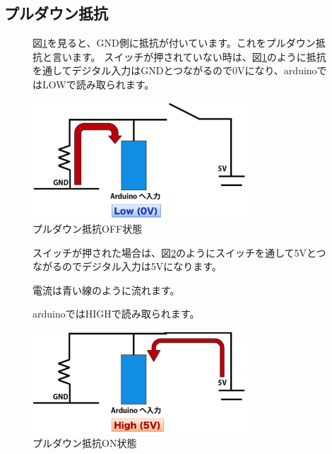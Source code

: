 \documentclass[11pt,a4paper]{jarticle}
\begin{document}

 
\subsection*{プルダウン抵抗}
\begin{figure}[h!]
 \begin{minipage}{0.5\columnwidth}
 図\ref{fig:pulldownSwitchOff}を見ると、GND側に抵抗が付いています。これをプルダウン抵抗と言います。
 スイッチが押されていない時は、図\ref{fig:pulldownSwitchOff}のように抵抗を通してデジタル入力はGNDとつながるので0Vになり、arduinoではLOWで読み取られます。
 \end{minipage}
 \begin{minipage}{0.5\columnwidth}
  \centering
  \includegraphics[width=80mm]{img/pulldown_off.eps}
  \caption{プルダウン抵抗OFF状態}
  \label{fig:pulldownSwitchOff}
 \end{minipage}
\end{figure}

\begin{figure}[h!]
 \begin{minipage}{0.5\columnwidth}
  スイッチが押された場合は、図\ref{fig:pulldownSwitchOn}のようにスイッチを通して5Vとつながるのでデジタル入力は5Vになります。
  
  電流は青い線のように流れます。
  
  arduinoではHIGHで読み取られます。
 \end{minipage}
 \begin{minipage}{0.5\columnwidth}
  \centering
  \includegraphics[width=80mm]{img/pulldown_on.eps}
  \caption{プルダウン抵抗ON状態}
  \label{fig:pulldownSwitchOn}
 \end{minipage}
\end{figure}
\end{document}
